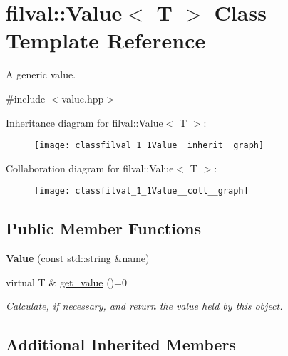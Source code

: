 \hypertarget{classfilval_1_1Value}{}\section{filval\+:\+:Value$<$ T $>$ Class Template Reference}
\label{classfilval_1_1Value}


A generic value.  




{\ttfamily \#include $<$value.\+hpp$>$}



Inheritance diagram for filval\+:\+:Value$<$ T $>$\+:
\nopagebreak
\begin{figure}[H]
\begin{center}
\leavevmode
\texttt{[image: classfilval\_1\_1Value\_\_inherit\_\_graph]}
\end{center}
\end{figure}


Collaboration diagram for filval\+:\+:Value$<$ T $>$\+:
\nopagebreak
\begin{figure}[H]
\begin{center}
\leavevmode
\texttt{[image: classfilval\_1\_1Value\_\_coll\_\_graph]}
\end{center}
\end{figure}
\subsection*{Public Member Functions}
\begin{DoxyCompactItemize}
\item 
\hypertarget{classfilval_1_1Value_acf84b59c04243cffee5c0f361465c83c}{}\label{classfilval_1_1Value_acf84b59c04243cffee5c0f361465c83c} 
{\bfseries Value} (const std\+::string \&\hyperlink{classfilval_1_1GenValue_a007e38c03ee041c2a657afa3d6e91ab1}{name})
\item 
\hypertarget{classfilval_1_1Value_a690d54d59d428984cc0f8e82ecf5ba9d}{}\label{classfilval_1_1Value_a690d54d59d428984cc0f8e82ecf5ba9d} 
virtual T \& \hyperlink{classfilval_1_1Value_a690d54d59d428984cc0f8e82ecf5ba9d}{get\+\_\+value} ()=0
\begin{DoxyCompactList}\small\item\em Calculate, if necessary, and return the value held by this object. \end{DoxyCompactList}\end{DoxyCompactItemize}
\subsection*{Additional Inherited Members}


